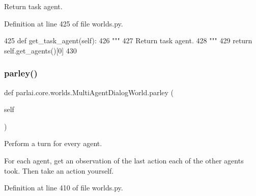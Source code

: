\begin{DoxyVerb}Return task agent.
\end{DoxyVerb}
 

Definition at line 425 of file worlds.\+py.


\begin{DoxyCode}
425     \textcolor{keyword}{def }get\_task\_agent(self):
426         \textcolor{stringliteral}{"""}
427 \textcolor{stringliteral}{        Return task agent.}
428 \textcolor{stringliteral}{        """}
429         \textcolor{keywordflow}{return} self.get\_agents()[0]
430 
\end{DoxyCode}
\mbox{\label{classparlai_1_1core_1_1worlds_1_1MultiAgentDialogWorld_a2b41d3026bc5afa04e7f874ba097b721}} 
\subsubsection{\texorpdfstring{parley()}{parley()}}
{\footnotesize\ttfamily def parlai.\+core.\+worlds.\+Multi\+Agent\+Dialog\+World.\+parley (\begin{DoxyParamCaption}\item[{}]{self }\end{DoxyParamCaption})}

\begin{DoxyVerb}Perform a turn for every agent.

For each agent, get an observation of the last action each of the other agents
took. Then take an action yourself.
\end{DoxyVerb}
 

Definition at line 410 of file worlds.\+py.


